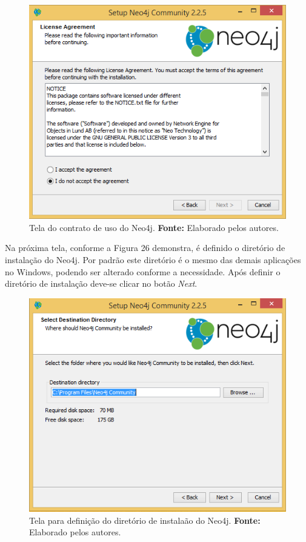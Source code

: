 \newpage
\begin{figure}[h!]
	\centerline{\includegraphics[scale=0.4]{./imagens/neo4j-install-step2.png}}
	\caption[Tela do contrato de uso do Neo4j]
	{Tela do contrato de uso do Neo4j. \textbf{Fonte:} Elaborado pelos autores.}
	\label{fig:exemplo1}
\end{figure}

\par Na próxima tela, conforme a Figura 26 demonstra, é definido o diretório de instalação do Neo4j. Por padrão este diretório é o mesmo das demais aplicações no Windows, podendo ser alterado conforme a necessidade. Após definir o diretório de instalação deve-se clicar no botão \textit{Next}.

\begin{figure}[h!]
	\centerline{\includegraphics[scale=0.4]{./imagens/neo4j-install-step3.png}}
	\caption[Tela para definição do diretório de instalaão do Neo4j]
	{Tela para definição do diretório de instalaão do Neo4j. \textbf{Fonte:} Elaborado pelos autores.}
	\label{fig:exemplo1}
\end{figure}

